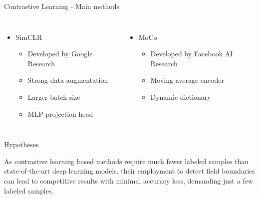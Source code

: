 \documentclass[xcolor=table]{beamer}
\begin{document}
\begin{frame}{Contrastive Learning - Main methods}
    
    \begin{columns}
            \begin{itemize}
        		\item SimCLR~\cite{chen2020}
        		\begin{itemize}
        		    \item Developed by Google Research
        		    \item Strong data augmentation
        		    \item Larger batch size
        		    \item MLP projection head
        		\end{itemize}
        	\end{itemize}
    	    \begin{itemize}
        		\item MoCo~\cite{he2020}
        		\begin{itemize}
        		    \item Developed by Facebook AI Research
        		    \item Moving average encoder
        		    \item Dynamic dictionary
        		\end{itemize}
    	    \end{itemize}
	\end{columns}
\end{frame}

\begin{frame}{Hypotheses}

	\begin{tcolorbox}[colback=blue!5,colframe=blue!75!black]
		As contrastive learning based methods require much fewer labeled samples than state-of-the-art deep learning models, their employment to detect field boundaries can lead to competitive results with minimal accuracy loss, demanding just a few labeled samples.
	\end{tcolorbox}
		
\end{frame}
\end{document}
